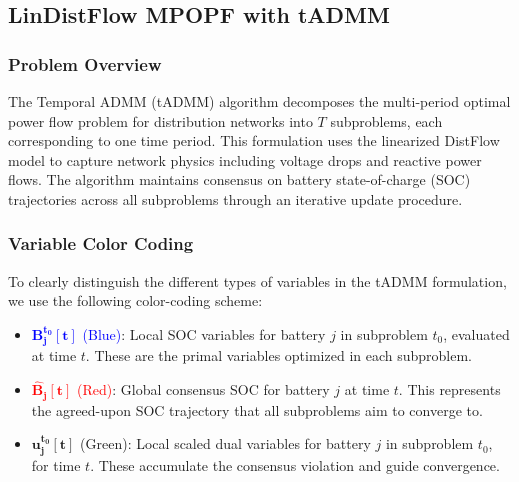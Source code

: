 \subsection{LinDistFlow MPOPF with tADMM}

\subsubsection{Problem Overview}

The Temporal ADMM (tADMM) algorithm decomposes the multi-period optimal power flow problem for distribution networks into $T$ subproblems, each corresponding to one time period. This formulation uses the linearized DistFlow model to capture network physics including voltage drops and reactive power flows. The algorithm maintains consensus on battery state-of-charge (SOC) trajectories across all subproblems through an iterative update procedure.

\subsubsection{Variable Color Coding}

To clearly distinguish the different types of variables in the tADMM formulation, we use the following color-coding scheme:
\begin{itemize}
    \item \textcolor{blue}{$\mathbf{B_j^{t_0}[t]}$ (Blue)}: Local SOC variables for battery $j$ in subproblem $t_0$, evaluated at time $t$. These are the primal variables optimized in each subproblem.
    \item \textcolor{red}{$\mathbf{\hat{B}_j[t]}$ (Red)}: Global consensus SOC for battery $j$ at time $t$. This represents the agreed-upon SOC trajectory that all subproblems aim to converge to.
    \item \textcolor{green!60!black}{$\mathbf{u_j^{t_0}[t]}$ (Green)}: Local scaled dual variables for battery $j$ in subproblem $t_0$, for time $t$. These accumulate the consensus violation and guide convergence.
\end{itemize}

